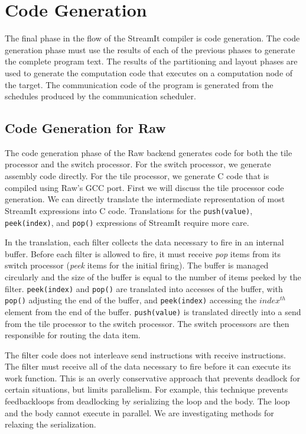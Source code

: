 \section{Code Generation}
\label{sec:codegen}

The final phase in the flow of the StreamIt compiler is code
generation.  The code generation phase must use the results of each of
the previous phases to generate the complete program text.  The
results of the partitioning and layout phases are used to generate the
computation code that executes on a computation node of the target.
The communication code of the program is generated from the schedules
produced by the communication scheduler.

\subsection{Code Generation for Raw}

The code generation phase of the Raw backend generates code for both
the tile processor and the switch processor.  For the switch
processor, we generate assembly code directly.  For the tile
processor, we generate C code that is compiled using Raw's GCC port.
First we will discuss the tile processor code generation.  We can
directly translate the intermediate representation of most StreamIt
expressions into C code.  Translations for the {\tt push(value)}, {\tt
peek(index)}, and {\tt pop()} expressions of StreamIt require more
care.

In the translation, each filter collects the data necessary to fire in
an internal buffer.  Before each filter is allowed to fire, it must
receive \emph{pop} items from its switch processor (\emph{peek} items
for the initial firing).  The buffer is managed circularly and the
size of the buffer is equal to the number of items peeked by the
filter.  {\tt peek(index)} and {\tt pop()} are translated into
accesses of the buffer, with {\tt pop()} adjusting the end of the
buffer, and {\tt peek(index)} accessing the $index^{th}$ element from
the end of the buffer.  {\tt push(value)} is translated directly into
a send from the tile processor to the switch processor.  The switch
processors are then responsible for routing the data item.

The filter code does not interleave send instructions with receive
instructions.  The filter must receive all of the data necessary to
fire before it can execute its work function.  This is an overly
conservative approach that prevents deadlock for certain situations,
but limits parallelism.  For example, this technique prevents
feedbackloops from deadlocking by serializing the loop and the body.
The loop and the body cannot execute in parallel.  We are
investigating methods for relaxing the serialization.

